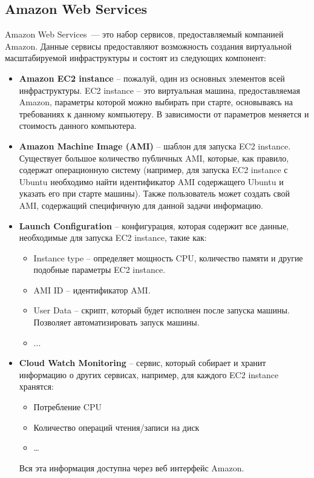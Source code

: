 \subsection{Amazon Web Services}
	Amazon Web Services\cite{aws}~--- это набор сервисов, предоставляемый компанией Amazon. Данные сервисы предоставляют возможность создания виртуальной масштабируемой инфраструктуры и состоят из следующих компонент:
\begin{itemize}
	\item \textbf{Amazon EC2 instance} -- пожалуй, один из основных элементов всей инфраструктуры. EC2 instance -- это виртуальная машина, предоставляемая Amazon, параметры которой можно выбирать при старте, основываясь на требованиях к данному компьютеру. В зависимости от параметров меняется и стоимость данного компьютера.
	\item \textbf{Amazon Machine Image (AMI)} -- шаблон для запуска EC2 instance. Существует большое количество публичных AMI, которые, как правило, содержат операционную систему (например, для запуска EC2 instance с Ubuntu необходимо найти идентификатор AMI содержащего Ubuntu  и указать его при старте машины). Также пользователь может создать свой AMI, содержащий специфичную для данной задачи информацию.
	\item \textbf{Launch Configuration} -- конфигурация, которая содержит все данные, необходимые для запуска EC2 instance, такие как: 
	\begin{itemize}
		\item Instance type -- определяет мощность CPU, количество памяти и другие подобные параметры  EC2 instance.
		\item AMI ID -- идентификатор AMI.
		\item User Data -- скрипт, который будет исполнен после запуска машины. Позволяет автоматизировать запуск машины.
		\item ...
	\end{itemize}
	\item \textbf{Cloud Watch Monitoring} -- сервис, который собирает и хранит информацию о других сервисах, например, для каждого EC2 instance хранятся: 
	\begin{itemize}
		\item Потребление CPU
		\item Количество операций чтения/записи на диск
		\item \dots
	\end{itemize}
	Вся эта информация доступна через веб интерфейс Amazon. %

\end{itemize}
